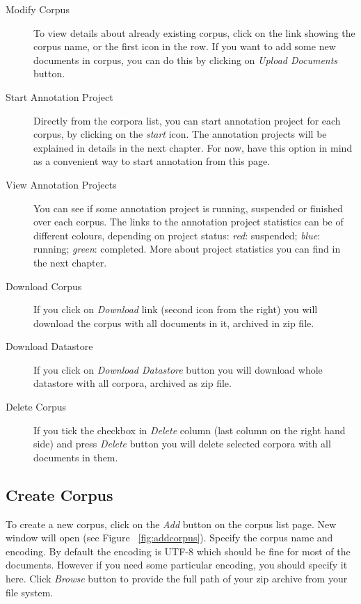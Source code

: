 \begin{description}
\item [Modify Corpus] To view details about already existing corpus, click on
the link showing the corpus name, or the first icon in the row. If you want to
add some new documents in corpus, you can do this by clicking on
\emph{Upload Documents} button.
\item [Start Annotation Project] Directly from the corpora list, you can start
annotation project for each corpus, by clicking on the \emph{start} icon. 
The annotation projects will be
explained in details in the next chapter. For now, have this option in mind as
a convenient way to start annotation from this page.

\item [View Annotation Projects] You can see if some annotation project is
running, suspended or finished over each corpus. The links to the annotation
project statistics can be of different colours, depending on project status:
\emph{red}: suspended; \emph{blue}: running; \emph{green}: completed. More about
project statistics you can find in the next chapter.

\item [Download Corpus] If you click on \emph{Download} link (second icon from
the right) you will download the corpus with all documents in it, archived in
zip file.
\item [Download Datastore] If you click on \emph{Download Datastore} button you
will download whole datastore with all corpora, archived as zip file.
\item [Delete Corpus] If you tick the checkbox in \emph{Delete} column (last
column on the right hand side) and press \emph{Delete} button you will delete
selected corpora with all documents in them.
\end{description}

\subsection{Create Corpus}
To create a new corpus, click on the \emph{Add} button on the corpus list page.
New window will open (see Figure ~\ref{fig:addcorpus}). Specify the corpus name
and encoding. By default the
encoding is UTF-8 which should be fine for most of the documents. However if
you need some particular encoding, you should specify it here. Click
\emph{Browse} button to provide the full path of your zip archive from your file
system.

